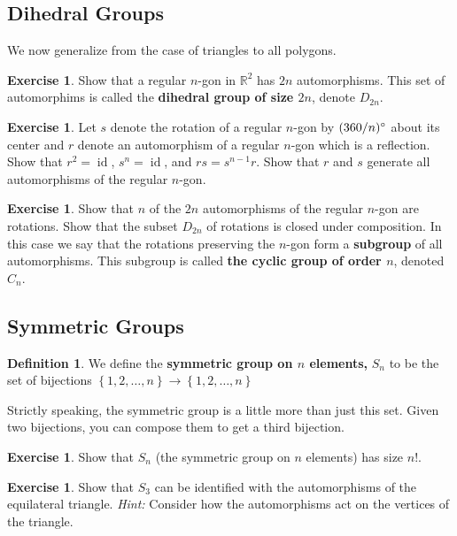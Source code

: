 \documentclass[reqno, 12pt, letter]{article}
\theoremstyle{plain}
\theoremstyle{definition}
\newtheorem{definition}[theorem]{Definition}
\newtheorem{exercise}[theorem]{Exercise}
\theoremstyle{remark}
\numberwithin{equation}{section}
\newcommand\br{{\mathbb R}}
\newcommand \ra{\rightarrow}
\DeclareMathOperator\id{id}
\begin{document}
\subsection{Dihedral Groups}

We now generalize from the case of triangles to all polygons.
\begin{exercise}
	\label{exercise:}
	Show that a regular $n$-gon in $\br^2$ has $2n$ automorphisms. This set of automorphims is called the {\bf dihedral group of size $2n$}, denote $D_{2n}$.
\end{exercise}
\begin{exercise}
	\label{exercise:}
	Let $s$ denote the rotation of a regular $n$-gon by $(360/n) \degree$ about its center and $r$ denote an automorphism of a regular $n$-gon
	which is a reflection. Show that $r^2 = \id$, $s^n = \id$, and $rs = s^{n-1} r$. Show that $r$ and $s$ generate all automorphisms of the
	regular $n$-gon.
\end{exercise}
\begin{exercise}
	\label{exercise:}
	Show that $n$ of the $2n$ automorphisms of the regular $n$-gon are rotations.
	Show that the subset $D_{2n}$ of rotations is closed under composition. In this case we say that the rotations preserving the $n$-gon
	form a {\bf subgroup} of all automorphisms. This subgroup is called {\bf the cyclic group of order $n$}, denoted $C_n$.
\end{exercise}

\subsection{Symmetric Groups}
\begin{definition}
	\label{definition:}
	We define the {\bf symmetric group on $n$ elements,} $S_n$ to be the set of bijections $\left\{ 1,2,\ldots, n \right\} \ra \left\{ 1, 2, \ldots, n \right\}$
\end{definition}
Strictly speaking, the symmetric group is a little more than just this set. Given two bijections, you can compose them to get a third bijection.
\begin{exercise}
	\label{exercise:}
	Show that $S_n$ (the symmetric group on $n$ elements) has size $n!$.
\end{exercise}
\begin{exercise}
	\label{exercise:}
	Show that $S_3$ can be identified with the automorphisms of the equilateral triangle.
	{\it Hint:} Consider how the automorphisms act on the vertices of the triangle.
\end{exercise}
\end{document}
